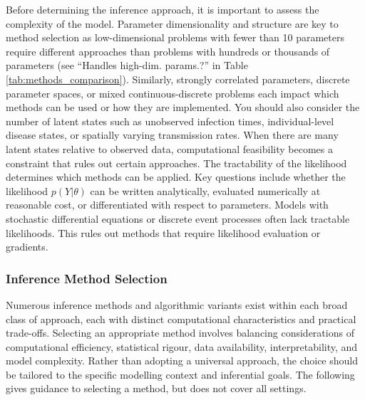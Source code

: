 \documentclass{article}
\begin{document}
Before determining the inference approach, it is important to assess the complexity of the model.
Parameter dimensionality and structure are key to method selection as low-dimensional problems with fewer than 10 parameters require different approaches than problems with hundreds or thousands of parameters (see ``Handles high-dim. params.?'' in Table \ref{tab:methods_comparison}).
Similarly, strongly correlated parameters, discrete parameter spaces, or mixed continuous-discrete problems each impact which methods can be used or how they are implemented.
You should also consider the number of latent states such as unobserved infection times, individual-level disease states, or spatially varying transmission rates.
When there are many latent states relative to observed data, computational feasibility becomes a constraint that rules out certain approaches.
The tractability of the likelihood determines which methods can be applied.
Key questions include whether the likelihood $p(Y | \theta)$ can be written analytically, evaluated numerically at reasonable cost, or differentiated with respect to parameters.
Models with stochastic differential equations or discrete event processes often lack tractable likelihoods.
This rules out methods that require likelihood evaluation or gradients.

\subsubsection{Inference Method Selection}

Numerous inference methods and algorithmic variants exist within each broad class of approach, each with distinct computational characteristics and practical trade-offs.
Selecting an appropriate method involves balancing considerations of computational efficiency, statistical rigour, data availability, interpretability, and model complexity.
Rather than adopting a universal approach, the choice should be tailored to the specific modelling context and inferential goals.
The following gives guidance to selecting a method, but does not cover all settings.
\end{document}
